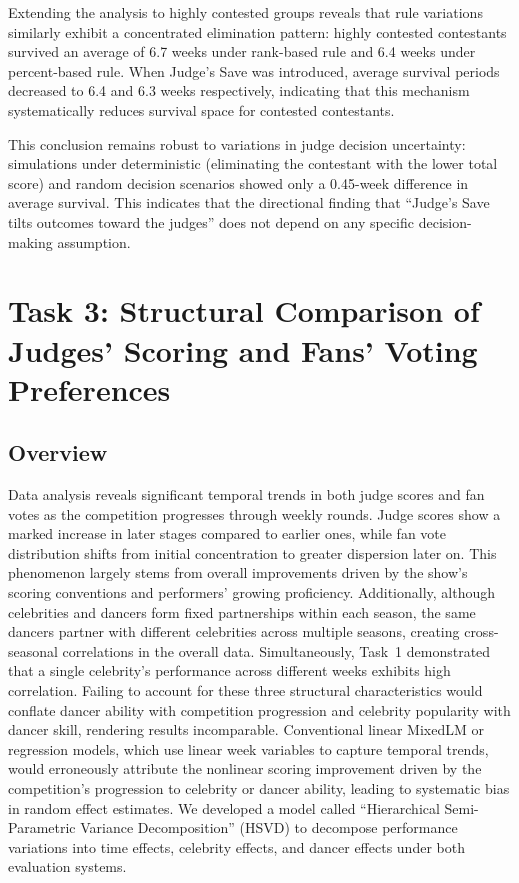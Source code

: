 \documentclass[12pt]{article}
\begin{document}
Extending the analysis to highly contested groups reveals that rule variations similarly exhibit a concentrated elimination pattern: highly contested contestants survived an average of 6.7 weeks under rank-based rule and 6.4 weeks under percent-based rule. When Judge's Save was introduced, average survival periods decreased to 6.4 and 6.3 weeks respectively, indicating that this mechanism systematically reduces survival space for contested contestants. 

This conclusion remains robust to variations in judge decision uncertainty: simulations under deterministic (eliminating the contestant with the lower total score) and random decision scenarios showed only a 0.45-week difference in average survival. This indicates that the directional finding that “Judge's Save tilts outcomes toward the judges” does not depend on any specific decision-making assumption.


\section{Task 3: Structural Comparison of Judges’ Scoring and Fans’ Voting Preferences}
\subsection{Overview}
Data analysis reveals significant temporal trends in both judge scores and fan votes as the competition progresses through weekly rounds. Judge scores show a marked increase in later stages compared to earlier ones, while fan vote distribution shifts from initial concentration to greater dispersion later on. This phenomenon largely stems from overall improvements driven by the show's scoring conventions and performers' growing proficiency. Additionally, although celebrities and dancers form fixed partnerships within each season, the same dancers partner with different celebrities across multiple seasons, creating cross-seasonal correlations in the overall data. Simultaneously, Task~1 demonstrated that a single celebrity's performance across different weeks exhibits high correlation. Failing to account for these three structural characteristics would conflate dancer ability with competition progression and celebrity popularity with dancer skill, rendering results incomparable. Conventional linear MixedLM or regression models, which use linear week variables to capture temporal trends, would erroneously attribute the nonlinear scoring improvement driven by the competition's progression to celebrity or dancer ability, leading to systematic bias in random effect estimates. We developed a model called ``Hierarchical Semi-Parametric Variance Decomposition'' (HSVD) to decompose performance variations into time effects, celebrity effects, and dancer effects under both evaluation systems.
\end{document}
